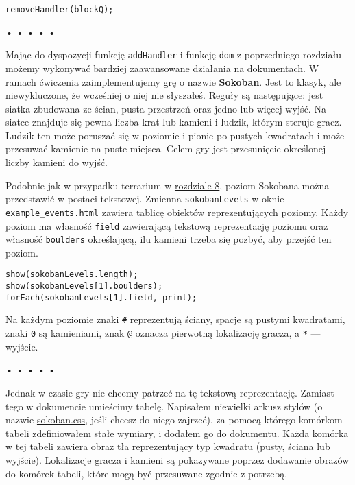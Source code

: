   
\begin{verbatim} 
removeHandler(blockQ);
 \end{verbatim}


\begin{center}
• • • • •
\end{center}

  
Mając do dyspozycji funkcję \texttt{addHandler} i funkcję \texttt{dom} z poprzedniego rozdziału możemy wykonywać bardziej zaawansowane działania na dokumentach. W ramach ćwiczenia zaimplementujemy grę o nazwie \textbf{Sokoban}. Jest to klasyk, ale niewykluczone, że wcześniej o niej nie słyszałeś. Reguły są następujące: jest siatka zbudowana ze ścian, pusta przestrzeń oraz jedno lub więcej wyjść. Na siatce znajduje się pewna liczba krat lub kamieni i ludzik, którym steruje gracz. Ludzik ten może poruszać się w poziomie i pionie po pustych kwadratach i może przesuwać kamienie na puste miejsca. Celem gry jest przesunięcie określonej liczby kamieni do wyjść.

  
Podobnie jak w przypadku terrarium w \hyperref[chap:8]{rozdziale 8}, poziom Sokobana można przedstawić w postaci tekstowej. Zmienna \texttt{sokobanLevels} w oknie \texttt{example\_events.html} zawiera tablicę obiektów reprezentujących poziomy. Każdy poziom ma własność \texttt{field} zawierającą tekstową reprezentację poziomu oraz własność \texttt{boulders} określającą, ilu kamieni trzeba się pozbyć, aby przejść ten poziom.

  
\begin{verbatim} 
show(sokobanLevels.length);
show(sokobanLevels[1].boulders);
forEach(sokobanLevels[1].field, print);
 \end{verbatim}
  
Na każdym poziomie znaki \texttt{\#} reprezentują ściany, spacje są pustymi kwadratami, znaki \texttt{0} są kamieniami, znak \texttt{@} oznacza pierwotną lokalizację gracza, a \texttt{*} — wyjście.



\begin{center}
• • • • •
\end{center}

  
Jednak w czasie gry nie chcemy patrzeć na tę tekstową reprezentację. Zamiast tego w dokumencie umieścimy tabelę. Napisałem niewielki arkusz stylów (o nazwie \href{http://www.bt4.pl/wp-content/ejs/sokoban.css}{sokoban.css}, jeśli chcesz do niego zajrzeć), za pomocą którego komórkom tabeli zdefiniowałem stałe wymiary, i dodałem go do dokumentu. Każda komórka w tej tabeli zawiera obraz tła reprezentujący typ kwadratu (pusty, ściana lub wyjście). Lokalizacje gracza i kamieni są pokazywane poprzez dodawanie obrazów do komórek tabeli, które mogą być przesuwane zgodnie z potrzebą.

